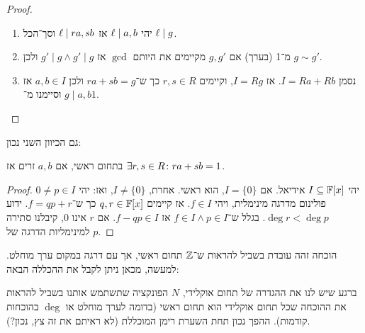 \documentclass[name=רשימות אלגברה לינארית 2א]{../../../tex/classes/megasumPreamble}
\begin{document}
	\begin{proof}\,
		\begin{enumerate}
			\item יהי $\ell \mid a, b$ אז $\ell \mid ra, sb$ וסך־הכל $\ell \mid g$. 
			\item מ־1 (בערך) אם $g, g'$ מקיימים את היותם $\gcd$ אז $g' \mid g \land g' \mid g$ ולכן $g \sim g'$. 
			\item נסמן $I = Ra + Rb$. אז $I = Rg$, וקיימים $r, s \in R$ כך ש־$ra + sb = g$ ולכן $a, b \in I$ אז $g \mid a, b$ וסיימנו מ־$1$. 
		\end{enumerate}\envendproof
	\end{proof}
	גם הכיוון השני נכון: 
	\begin{Collary}
		בתחום ראשי, אם $a, b$ זרים אז $\exists r, s \in R\colon ra + sb = 1$. 
	\end{Collary}
	\begin{proof}
		יהי $I \subseteq \mathbb{F}[x]$ אידיאל. אם $I = \{0\}$, הוא ראשי. אחרת, $I \neq \{0\}$, ואז: יהי $0 \neq p \in I$ פולינום מדרגה מינימלית, ויהי $f \in I$. אז קיימים $q, r \in \mathbb{F}[x]$ כך ש־$f = qp + r$. ידוע $\deg r < \deg p$. בגלל ש־$f \in I \land p \in I$ אז $f - qp \in I$. אם $r$ אינו $0$, קיבלנו סתירה למינימליות הדרגה של $p$. 
	\end{proof}
	הוכחה זהה עובדת בשביל להראות ש־$\mathbb{Z}$ תחום ראשי, אך עם דרגה במקום ערך מוחלט. למעשה, מכאן ניתן לקבל את ההכללה הבאה:
	
	ברגע שיש לנו את ההגדרה של תחום אוקלידי, $N$ הפונקציה שתשתמש אותנו בשביל להראות את ההוכחה שכל תחום אוקלידי הוא תחום ראשי (בדומה לערך מוחלט או $\deg$ בהוכחות קודמות). ההפך נכון תחת השערת רימן המוכללת (לא ראיתם את זה צץ, נכון?). 
	
\end{document}
